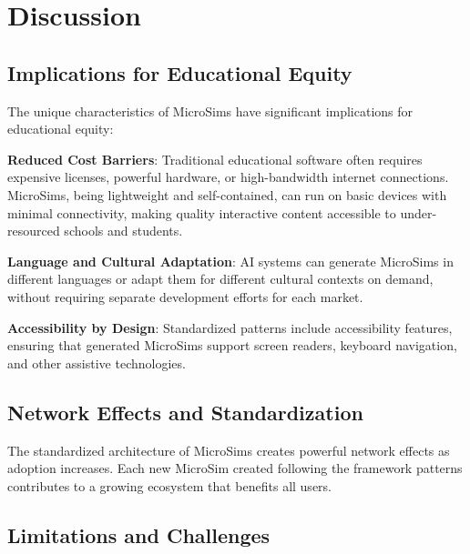 \section{Discussion}
\label{sec:discussion}


\subsection{Implications for Educational Equity}

The unique characteristics of MicroSims have significant implications for educational equity:

\textbf{Reduced Cost Barriers}: Traditional educational software often requires expensive licenses, powerful hardware, or high-bandwidth internet connections. MicroSims, being lightweight and self-contained, can run on basic devices with minimal connectivity, making quality interactive content accessible to under-resourced schools and students.

\textbf{Language and Cultural Adaptation}: AI systems can generate MicroSims in different languages or adapt them for different cultural contexts on demand, without requiring separate development efforts for each market.

\textbf{Accessibility by Design}: Standardized patterns include accessibility features, ensuring that generated MicroSims support screen readers, keyboard navigation, and other assistive technologies.

\subsection{Network Effects and Standardization}

The standardized architecture of MicroSims creates powerful network effects as adoption increases. Each new MicroSim created following the framework patterns contributes to a growing ecosystem that benefits all users.

\subsection{Limitations and Challenges}

